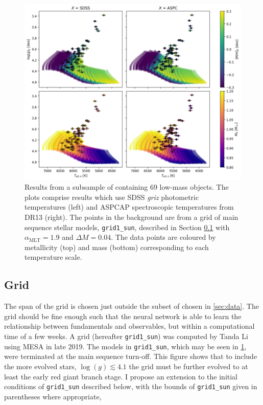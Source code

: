 \documentclass[twocolumn]{aastex63}
\newcommand{\mlt}{\alpha_{\mathrm{MLT}}}
\begin{document}


\begin{figure}[htb!]
    \includegraphics[width=1.0\textwidth]{figures/subsample_hrd.png}
    \caption{Results from a subsample of  containing 69 low-mass objects. The plots comprise results which use SDSS \textit{griz} photometric temperatures (left) and ASPCAP spectroscopic temperatures from DR13 (right). The points in the background are from a grid of main sequence stellar models, \texttt{grid1\_sun}, described in Section \ref{sec:grid} with $\mlt = 1.9$ and $\Delta M = 0.04$. The data points are coloured by metallicity (top) and mass (bottom) corresponding to each temperature scale.}
    \label{fig:subsample_hrd}
\end{figure}

\subsection{Grid}\label{sec:grid}

The span of the grid is chosen just outside the subset of  chosen in \ref{sec:data}. The grid should be fine enough such that the neural network is able to learn the relationship between fundamentals and observables, but within a computational time of a few weeks. A grid (hereafter \texttt{grid1\_sun}) was computed by Tanda Li using MESA in late 2019. The models in \texttt{grid1\_sun}, which may be seen in \ref{fig:subsample_hrd}, were terminated at the main sequence turn-off. This figure shows that to include the more evolved stars, $\log(g) \lesssim 4.1$ the grid must be further evolved to at least the early red giant branch stage. I propose an extension to the initial conditions of \texttt{grid1\_sun} described below, with the bounds of \texttt{grid1\_sun} given in parentheses where appropriate,
\end{document}
